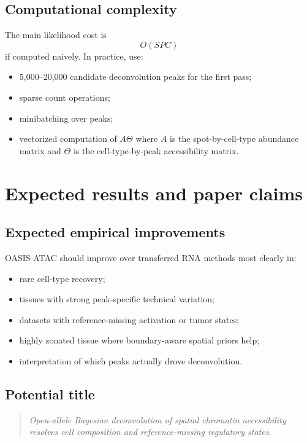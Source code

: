 \documentclass[11pt]{article}
\begin{document}
\subsection{Computational complexity}

The main likelihood cost is
\[
O(SPC)
\]
if computed naively. In practice, use:
\begin{itemize}
    \item 5,000--20,000 candidate deconvolution peaks for the first pass;
    \item sparse count operations;
    \item minibatching over peaks;
    \item vectorized computation of $A\Theta$ where $A$ is the spot-by-cell-type abundance matrix and $\Theta$ is the cell-type-by-peak accessibility matrix.
\end{itemize}

\section{Expected results and paper claims}

\subsection{Expected empirical improvements}

OASIS-ATAC should improve over transferred RNA methods most clearly in:
\begin{itemize}
    \item rare cell-type recovery;
    \item tissues with strong peak-specific technical variation;
    \item datasets with reference-missing activation or tumor states;
    \item highly zonated tissue where boundary-aware spatial priors help;
    \item interpretation of which peaks actually drove deconvolution.
\end{itemize}

\subsection{Potential title}

\begin{quote}
\textit{Open-allele Bayesian deconvolution of spatial chromatin accessibility resolves cell composition and reference-missing regulatory states.}
\end{quote}
\end{document}
